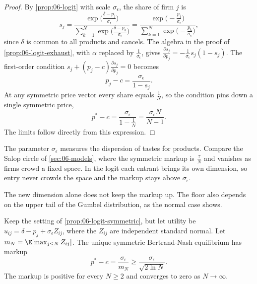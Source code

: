 \begin{proof}
By \cref{prop:06-logit} with scale $\sigma_\epsilon$, the share of firm $j$ is
\begin{equation*}
  s_j = \frac{\exp\bigl(\frac{\delta - p_j}{\sigma_\epsilon}\bigr)}{\sum_{k=1}^{N} \exp\bigl(\frac{\delta - p_k}{\sigma_\epsilon}\bigr)}
      = \frac{\exp\bigl(-\frac{p_j}{\sigma_\epsilon}\bigr)}{\sum_{k=1}^{N} \exp\bigl(-\frac{p_k}{\sigma_\epsilon}\bigr)} ,
\end{equation*}
since $\delta$ is common to all products and cancels. The algebra in the proof of \cref{prop:06-logit-exhaust}, with
$\alpha$ replaced by $\frac{1}{\sigma_\epsilon}$, gives $\frac{\partial s_j}{\partial p_j} = -\frac{1}{\sigma_\epsilon}
s_j (1 - s_j)$. The first-order condition $s_j + (p_j - c)\frac{\partial s_j}{\partial p_j} = 0$ becomes
\begin{equation*}
  p_j - c = \frac{\sigma_\epsilon}{1 - s_j}.
\end{equation*}
At any symmetric price vector every share equals $\frac{1}{N}$, so the condition pins down a single symmetric price,
\begin{equation*}
  p^* - c = \frac{\sigma_\epsilon}{1 - \frac{1}{N}} = \frac{\sigma_\epsilon N}{N - 1}.
\end{equation*}
The limits follow directly from this expression.
\end{proof}

The parameter $\sigma_\epsilon$ measures the dispersion of tastes for products. Compare the Salop circle of
\cref{sec:06-models}, where the symmetric markup is $\frac{\tau}{N}$ and vanishes as firms crowd a fixed space. In the
logit each entrant brings its own dimension, so entry never crowds the space and the markup stays above
$\sigma_\epsilon$.

The new dimension alone does not keep the markup up. The floor also depends on the upper tail of the Gumbel
distribution, as the normal case shows.

\begin{proposition}\label{prop:06-normal-symmetric}
Keep the setting of \cref{prop:06-logit-symmetric}, but let utility be $u_{ij} = \delta - p_j + \sigma_\epsilon Z_{ij}$,
where the $Z_{ij}$ are independent standard normal. Let $m_N = \E[\max_{j \le N} Z_{ij}]$. The unique symmetric
Bertrand-Nash equilibrium has markup
\begin{equation}\label{eq:06-normal-markup}
  p^* - c = \frac{\sigma_\epsilon}{m_N} \ge \frac{\sigma_\epsilon}{\sqrt{2\ln N}} .
\end{equation}
The markup is positive for every $N \ge 2$ and converges to zero as $N \to \infty$.
\end{proposition}

